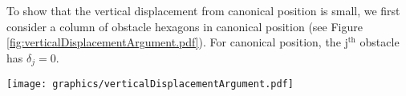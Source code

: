 


To show that the vertical displacement from canonical position is small, we first consider a column of obstacle hexagons in canonical position (see Figure \ref{fig:verticalDisplacementArgument.pdf}).  
For canonical position, the $\text{j}^\text{th}$ obstacle has $\delta_j = 0$.

\begin{minipage}{\linewidth}
\begin{center}
\texttt{[image: graphics/verticalDisplacementArgument.pdf]}
\label{fig:verticalDisplacementArgument.pdf}
\end{center}
\end{minipage}

